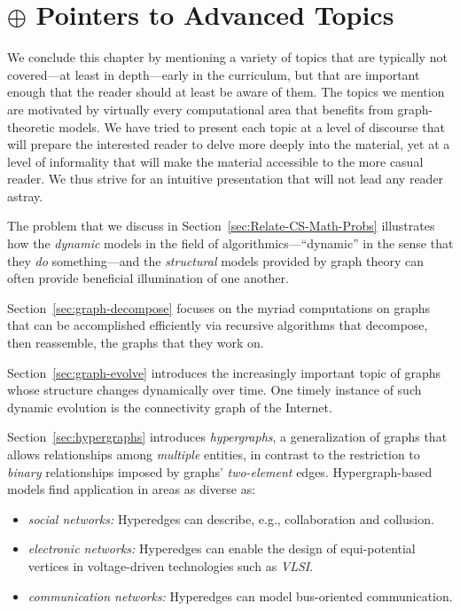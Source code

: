 
\section{$\oplus$ Pointers to Advanced Topics}
\label{sec:advanced-topics}


We conclude this chapter by mentioning a variety of topics that are
typically not covered---at least in depth---early in the curriculum,
but that are important enough that the reader should at least be aware
of them.  The topics we mention are motivated by virtually every
computational area that benefits from graph-theoretic models.  We have
tried to present each topic at a level of discourse that
will prepare the interested reader to delve more deeply into the
material, yet at a level of informality that will make the material
accessible to the more casual reader.  We thus strive for an intuitive
presentation that will not lead any reader astray.

The problem that we discuss in Section~\ref{sec:Relate-CS-Math-Probs}
illustrates how the {\em dynamic} models in the field of
algorithmics---``dynamic'' in the sense that they {\em do}
something---and the {\em structural} models provided by graph theory
can often provide beneficial illumination of one another.

Section~\ref{sec:graph-decompose} focuses on the myriad computations
on graphs that can be accomplished efficiently via recursive algorithms
that decompose, then reassemble, the graphs that they work on.

Section~\ref{sec:graph-evolve}  introduces the increasingly important topic of graphs whose structure
changes dynamically over time.  One timely instance of such dynamic evolution is the connectivity 
graph of the Internet.

Section~\ref{sec:hypergraphs} introduces {\it hypergraphs}, a generalization of
graphs that allows relationships among {\em multiple} entities, in contrast to the restriction to
{\em binary} relationships imposed by graphs' {\em two-element} edges.
Hypergraph-based models find application in areas as diverse as:
\begin{itemize}
\item
{\it social networks:} Hyperedges can describe, e.g., collaboration and collusion.
\item
{\it electronic networks:} Hyperedges can enable the design of equi-potential vertices in 
voltage-driven technologies such as {\it VLSI}.
\item
{\it communication networks:} Hyperedges can model bus-oriented communication.
\end{itemize}



